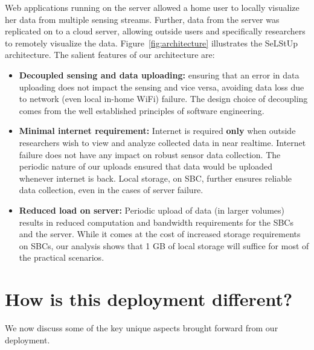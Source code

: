 \documentclass[10pt]{sensys-proc}
\newcommand{\figref}[1]{Figure~\ref{#1}}
\newcommand{\selstups}{SeLStUp }
\begin{document}
Web applications running on the server allowed a home user to locally visualize her data from multiple sensing streams. Further, data from the server was replicated on to a cloud server, allowing outside users and specifically researchers to remotely visualize the data. \figref{fig:architecture} illustrates the \selstups architecture. The salient features of our architecture are:

\begin{itemize}
\item \textbf{Decoupled sensing and data uploading:} ensuring that an error in data uploading does not impact the sensing and vice versa, avoiding data loss due to network (even local in-home WiFi) failure. The design choice of decoupling comes from the well established principles of software engineering.
\item \textbf{Minimal internet requirement:} Internet is required \textbf{only} when outside researchers wish to view and analyze collected data in near realtime. Internet failure does not have any impact on robust sensor data collection. The periodic nature of our uploads ensured that data would be uploaded whenever internet is back. Local storage, on SBC, further ensures reliable data collection, even in the cases of server failure. %
\item \textbf{Reduced load on server:} Periodic upload of data (in larger volumes) results in reduced computation and bandwidth requirements for the SBCs and the server. While it comes at the cost of increased storage requirements on SBCs, our analysis shows that 1 GB of local storage will suffice for most of the practical scenarios. %
\end{itemize}



\section{How is this deployment different?}
\label{sec:learning}
We now discuss some of the key unique aspects brought forward from our deployment. 
\end{document}
